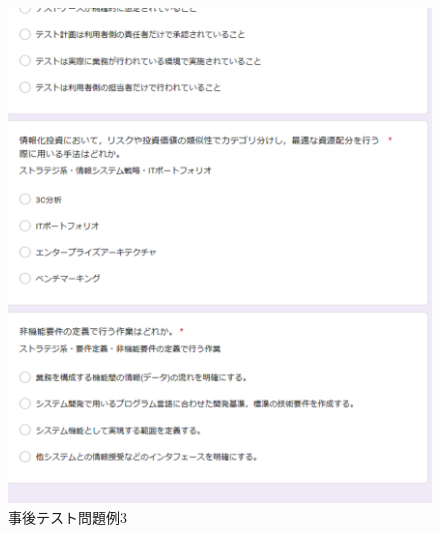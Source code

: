 \begin{figure}[htbp]
\begin{center}
\includegraphics[width=16cm]{img/jizen6.eps}
\end{center}
\caption{事後テスト問題例3}
\label{fig:jigo6}
\end{figure}

